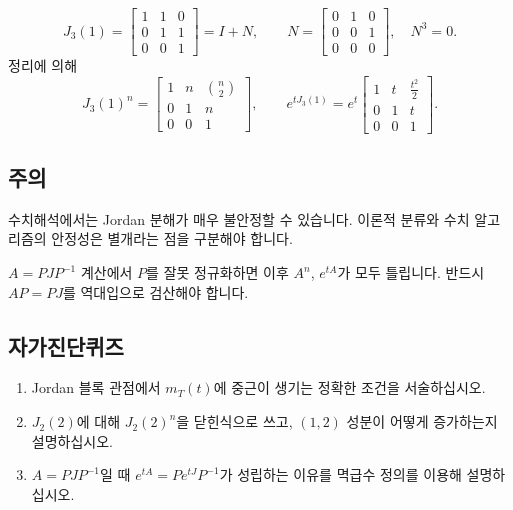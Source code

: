 \begin{example}
$$
J_3(1)=
\begin{bmatrix}
1&1&0\\
0&1&1\\
0&0&1
\end{bmatrix}
=I+N,\qquad
N=
\begin{bmatrix}
0&1&0\\
0&0&1\\
0&0&0
\end{bmatrix},\quad N^3=0.
$$
정리에 의해
$$
J_3(1)^n=
\begin{bmatrix}
1&n&\binom{n}{2}\\
0&1&n\\
0&0&1
\end{bmatrix},
\qquad
e^{tJ_3(1)}=e^t
\begin{bmatrix}
1&t&\frac{t^2}{2}\\
0&1&t\\
0&0&1
\end{bmatrix}.
$$
\end{example}

\subsection*{주의}
\begin{warning}
수치해석에서는 Jordan 분해가 매우 불안정할 수 있습니다. 이론적 분류와 수치 알고리즘의 안정성은 별개라는 점을 구분해야 합니다.
\end{warning}
\begin{warning}
$A=PJP^{-1}$ 계산에서 $P$를 잘못 정규화하면 이후 $A^n$, $e^{tA}$가 모두 틀립니다. 반드시 $AP=PJ$를 역대입으로 검산해야 합니다.
\end{warning}

\subsection*{자가진단퀴즈}
\begin{enumerate}[label=\arabic*.]
\item Jordan 블록 관점에서 $m_T(t)$에 중근이 생기는 정확한 조건을 서술하십시오.
\item $J_2(2)$에 대해 $J_2(2)^n$을 닫힌식으로 쓰고, $(1,2)$ 성분이 어떻게 증가하는지 설명하십시오.
\item $A=PJP^{-1}$일 때 $e^{tA}=Pe^{tJ}P^{-1}$가 성립하는 이유를 멱급수 정의를 이용해 설명하십시오.
\end{enumerate}


